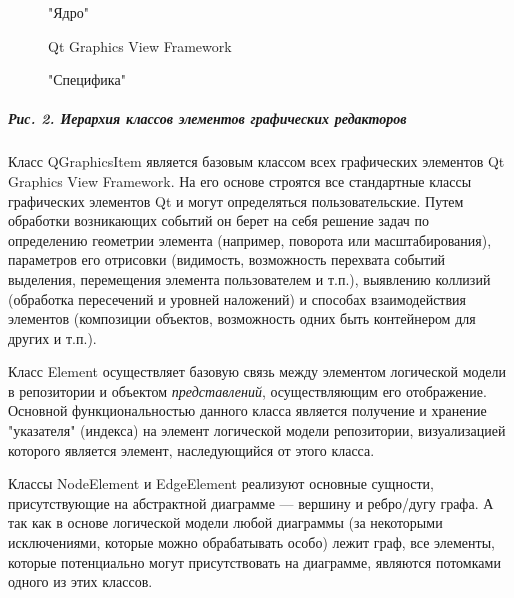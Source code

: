 \documentclass[a5paper]{article}
\begin{document}
\begin{figure}
\begin{center}
\begin{minipage}{2.849cm}

"Ядро"
\end{minipage}
\end{center}
\end{figure}
\begin{figure}
\begin{center}
\begin{minipage}{6.024cm}
{
Qt Graphics View Framework}
\end{minipage}
\end{center}
\end{figure}
\begin{figure}
\begin{center}
\begin{minipage}{3.801cm}

"Специфика"
\end{minipage}
\end{center}
\end{figure}
\subparagraph[Рис. 2. Иерархия классов элементов графических
редакторов]{Рис. 2. Иерархия классов элементов графических редакторов}


Класс QGraphicsItem является базовым классом всех графических элементов Qt
Graphics View Framework. На его основе строятся все
стандартные классы графических элементов Qt
и могут определяться пользовательские. Путем обработки возникающих
событий он берет на себя решение задач по определению геометрии
элемента (например, поворота или масштабирования), параметров его
отрисовки (видимость, возможность перехвата событий выделения,
перемещения элемента пользователем и т.п.), выявлению коллизий
(обработка пересечений и уровней наложений) и способах взаимодействия
элементов (композиции объектов, возможность одних быть контейнером для
других и т.п.).

Класс Element осуществляет базовую связь
между элементом логической модели в репозитории и объектом
\textit{представлений}, осуществляющим его отображение. Основной
функциональностью данного класса является получение и хранение
"указателя" (индекса) на элемент логической модели репозитории,
визуализацией которого является элемент, наследующийся от этого класса.

Классы NodeElement и EdgeElement реализуют основные сущности,
присутствующие на абстрактной диаграмме --- вершину и ребро/дугу графа. А
так как в основе логической модели любой диаграммы (за некоторыми
исключениями, которые можно обрабатывать особо) лежит граф, все
элементы, которые потенциально могут присутствовать на диаграмме,
являются потомками одного из этих классов.
\end{document}
